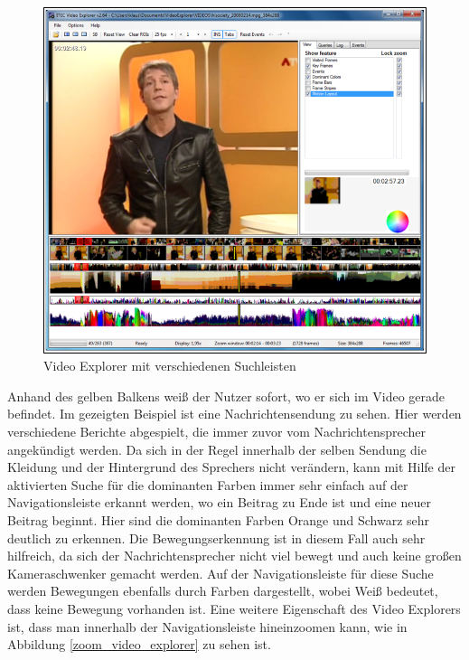 \documentclass[11pt,a4paper]{report}
\begin{document}
\begin{figure}[h]
\begin{center}
\includegraphics[scale=1]{./images/6.png}
\caption{Video Explorer mit verschiedenen Suchleisten \cite{schoeffmann2010video}}
\label{video_explorer}
\end{center}
\end{figure}
Anhand des gelben Balkens weiß der Nutzer sofort, wo er sich im Video gerade befindet. Im gezeigten Beispiel ist eine Nachrichtensendung zu sehen. Hier werden verschiedene Berichte abgespielt, die immer zuvor vom Nachrichtensprecher angekündigt werden. Da sich in der Regel innerhalb der selben Sendung die Kleidung und der Hintergrund des Sprechers nicht verändern, kann mit Hilfe der aktivierten Suche für die dominanten Farben immer sehr einfach auf der Navigationsleiste erkannt werden, wo ein Beitrag zu Ende ist und eine neuer Beitrag beginnt. Hier sind die dominanten Farben Orange und Schwarz sehr deutlich zu erkennen. Die Bewegungserkennung ist in diesem Fall auch sehr hilfreich, da sich der Nachrichtensprecher nicht viel bewegt und auch keine großen Kameraschwenker gemacht werden. Auf der Navigationsleiste für diese Suche werden Bewegungen ebenfalls durch Farben dargestellt, wobei Weiß bedeutet, dass keine Bewegung vorhanden ist. Eine weitere Eigenschaft des Video Explorers ist, dass man innerhalb der Navigationsleiste hineinzoomen kann, wie in Abbildung \ref{zoom_video_explorer} zu sehen ist.
\end{document}
